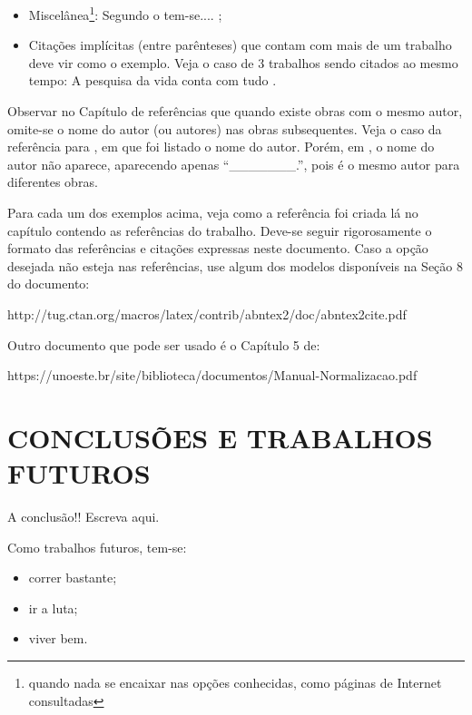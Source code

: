 \documentclass{templateppgmo}
\numberwithin{figure}{chapter}
\numberwithin{table}{chapter}
\numberwithin{quadro}{chapter}
\numberwithin{algoritmo}{chapter}
\numberwithin{codigo}{chapter}
\begin{document}
\begin{itemize}
  	\item Miscelânea\footnote{quando nada se encaixar nas opções conhecidas, como páginas de Internet consultadas}: Segundo o  tem-se.... \cite{araujo:2015:classe_abnt2};

  	\item Citações implícitas (entre parênteses) que contam com mais de um trabalho deve vir como o exemplo. Veja o caso de 3 trabalhos sendo citados ao mesmo tempo: A pesquisa da vida conta com tudo \cite{silva:incollection,silva:artigo, cruvinel1989}.

  	\end{itemize}

  	Observar no Capítulo de referências que quando existe obras com o mesmo autor, omite-se o nome do autor (ou autores) nas obras subsequentes. Veja o caso da referência para , em que foi listado o nome do autor. Porém, em , o nome do autor não aparece, aparecendo apenas ``\_\_\_\_\_\_\_.'', pois é o mesmo autor para diferentes obras.

  	Para cada um dos exemplos acima, veja como a referência foi criada lá no capítulo contendo as referências do trabalho. Deve-se seguir rigorosamente o formato das referências e citações expressas neste documento. Caso a opção desejada não esteja nas referências, use algum dos modelos disponíveis na Seção 8 do documento:

  	http://tug.ctan.org/macros/latex/contrib/abntex2/doc/abntex2cite.pdf

  	Outro documento que pode ser usado é o Capítulo 5 de:

  	https://unoeste.br/site/biblioteca/documentos/Manual-Normalizacao.pdf


  	\chapter{CONCLUSÕES E TRABALHOS FUTUROS}


  	A conclusão!! Escreva aqui.

  	Como trabalhos futuros, tem-se:
  	\begin{itemize}
  	\item correr bastante;
  	\item ir a luta;
  	\item viver bem.
  	\end{itemize}



  	\postextual
  	\printindex
\end{document}
